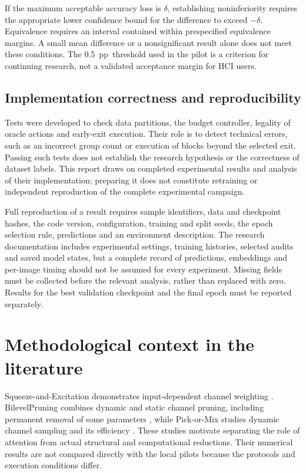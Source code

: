 \documentclass[12pt,a4paper]{article}
\newcommand{\pp}{pp}
\begin{document}
If the maximum acceptable accuracy loss is $\delta$, establishing
noninferiority requires the appropriate lower confidence bound
for the difference to exceed $-\delta$.
Equivalence requires an interval contained within prespecified equivalence
margins. A small mean difference or a nonsignificant result alone
does not meet these conditions.
The 0.5~\pp\ threshold used in the pilot is a criterion for continuing
research, not a validated acceptance margin for HCI users.

\subsection{Implementation correctness and reproducibility}

Tests were developed to check data partitions, the budget controller,
legality of oracle actions and early-exit execution.
Their role is to detect technical errors, such as an incorrect group
count or execution of blocks beyond the selected exit.
Passing such tests does not establish the research hypothesis or
the correctness of dataset labels.
This report draws on completed experimental results and analysis of their implementation;
preparing it does not constitute retraining or independent reproduction
of the complete experimental campaign.

Full reproduction of a result requires sample identifiers, data and
checkpoint hashes, the code version, configuration, training and split
seeds, the epoch selection rule, predictions and an environment description.
The research documentation includes experimental settings, training histories,
selected audits and saved model states,
but a complete record of predictions, embeddings and per-image timing
should not be assumed for every experiment.
Missing fields must be collected before the relevant analysis,
rather than replaced with zero.
Results for the best validation checkpoint and the final epoch must
be reported separately.

\section{Methodological context in the literature}

Squeeze-and-Excitation demonstrates input-dependent channel weighting
\cite{senet}.
BilevelPruning combines dynamic and static channel pruning, including
permanent removal of some parameters \cite{bilevel},
while Pick-or-Mix studies dynamic channel sampling and its efficiency
\cite{pix}.
These studies motivate separating the role of attention from actual
structural and computational reductions.
Their numerical results are not compared directly with the local pilots
because the protocols and execution conditions differ.
\end{document}
